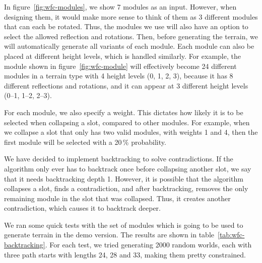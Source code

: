 In figure~\ref{fig:wfc-modules}, we show 7 modules as an input.
However, when designing them, it would make more sense to think of them as 3 different modules that can each be rotated.
Thus, the modules we use will also have an option to select the allowed reflection and rotations.
Then, before generating the terrain, we will automatically generate all variants of each module.
Each module can also be placed at different height levels, which is handled similarly.
For example, the module shown in figure~\ref{fig:wfc-module} will effectively become 24 different modules in a terrain type with 4 height levels (0, 1, 2, 3), because it has 8 different reflections and rotations, and it can appear at 3 different height levels (0--1, 1--2, 2--3).

For each module, we also specify a weight.
This dictates how likely it is to be selected when collapsing a slot, compared to other modules.
For example, when we collapse a slot that only has two valid modules, with weights 1 and 4, then the first module will be selected with a 20\,\% probability.

We have decided to implement backtracking to solve contradictions.
If the algorithm only ever has to backtrack once before collapsing another slot, we say that it needs backtracking depth 1.
However, it is possible that the algorithm collapses a slot, finds a contradiction, and after backtracking, removes the only remaining module in the slot that was collapsed.
Thus, it creates another contradiction, which causes it to backtrack deeper.

We ran some quick tests with the set of modules which is going to be used to generate terrain in the demo version.
The results are shown in table~\ref{tab:wfc-backtracking}.
For each test, we tried generating 2000 random worlds, each with three path starts with lengths 24, 28 and 33, making them pretty constrained.

